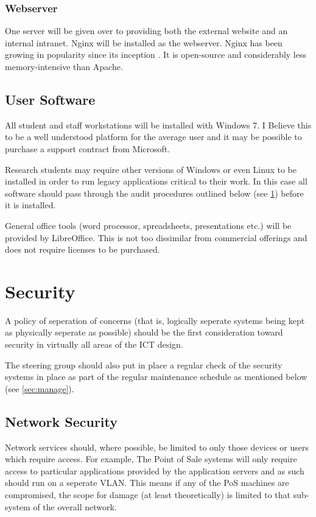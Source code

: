 \documentclass[a4paper, twoside]{article}
\begin{document}
\subsubsection{Webserver}
One server will be given over to providing both the external website and an
internal intranet. Nginx will be installed as the webserver. Nginx has been
growing in popularity since its inception \cite{nginx}. It is open-source and
considerably less memory-intensive than Apache.

\subsection{User Software}
All student and staff workstations will be installed with Windows 7. I Believe
this to be a well understood platform for the average user and it may be
possible to purchase a support contract from Microsoft.

Research students may require other versions of Windows or even Linux to be
installed in order to run legacy applications critical to their work. In this
case all software should pass through the audit procedures outlined below (see
\ref{sec:security}) before it is installed.

General office tools (word processor, spreadsheets, presentations etc.) will be
provided by LibreOffice. This is not too dissimilar from commercial offerings
and does not require licenses to be purchased.

\section{Security}
\label{sec:security}
A policy of seperation of concerns (that is, logically seperate systems being
kept as physically seperate as possible) should be the first consideration
toward security in virtually all areas of the ICT design.

The steering group should also put in place a regular check of the security
systems in place as part of the regular maintenance schedule as mentioned below
(see \ref{sec:manage}).

\subsection{Network Security}
Network services should, where possible, be limited to only those devices or
users which require access. For example, The Point of Sale systems will only
require access to particular applications provided by the application servers
and as such should run on a seperate VLAN. This means if any of the PoS
machines are compromised, the scope for damage (at least theoretically) is
limited to that sub-system of the overall network.
\end{document}
